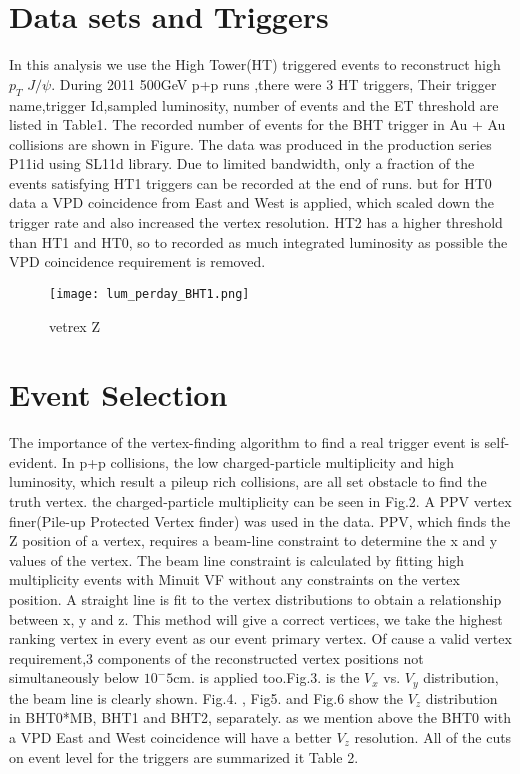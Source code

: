 \documentclass[18pt,a4paper]{article}
\begin{document}
\section{Data sets and Triggers} 
In this analysis we use the High Tower(HT) triggered events to reconstruct high $p_T$ $J/\psi$. During 2011 500GeV p+p runs ,there were 3 HT triggers, Their trigger name,trigger Id,sampled luminosity, number of events and the ET threshold are listed in Table1. The recorded number of events for the BHT trigger in Au + Au collisions are shown in Figure.  The data was produced in the production series P11id using SL11d library. Due to limited bandwidth, only a fraction of the events satisfying HT1 triggers can be recorded at the end of runs. but for HT0 data a VPD coincidence from East and West is applied, which scaled down the trigger rate and also increased the vertex resolution. HT2 has a higher threshold than HT1 and HT0, so to recorded as much integrated luminosity as possible the VPD coincidence requirement  is removed. 
\begin{figure}
\centering
\texttt{[image: lum\_perday\_BHT1.png]}
\caption{vetrex Z}
\label{fig1}
\end{figure}

\section{Event Selection}
The importance of  the vertex-finding algorithm to find a real trigger event is self-evident. In p+p collisions, the low charged-particle multiplicity and high luminosity, which result a pileup rich collisions, are all set obstacle to find the truth vertex. the charged-particle multiplicity can be seen in Fig.2. A PPV vertex finer(Pile-up Protected Vertex finder) was used in the data. PPV,  which finds the Z position of a vertex, requires a beam-line constraint to determine the x and y values of the vertex. The beam line constraint is calculated by fitting high multiplicity events with Minuit VF without any constraints on the  vertex position. A straight line is fit to the vertex distributions to obtain a relationship between x, y and z. This method will give a correct vertices,  we take the highest ranking vertex in every event as our event primary vertex. Of cause a valid vertex requirement,3 components of the  reconstructed vertex positions not simultaneously below $10^-5$cm. is applied too.Fig.3. is  the $V_x$ vs. $V_y$ distribution, the beam line is clearly shown. Fig.4. , Fig5. and Fig.6 show the $V_z$ distribution in BHT0*MB, BHT1 and BHT2, separately.  as we mention above the BHT0 with a VPD  East  and West coincidence will have a better $V_z$ resolution.  All of the cuts on event level for the triggers are summarized it Table 2.
\end{document}
